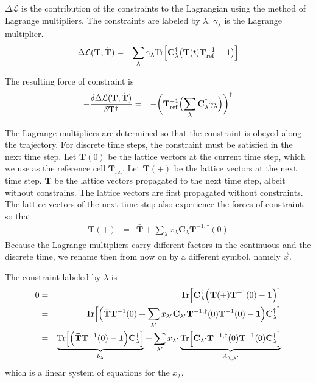 \documentclass[final,12pt,makeidx,DIV=calc]{article}
\newcommand{\mat}[1]{\mathbf{#1}}
\newcommand{\Tr}{\mathrm{Tr}}      %
\begin{document}
{{{{{{$\Delta\mathcal{L}$ is the contribution of the constraints to the
Lagrangian using the method of Lagrange multipliers.  The constraints
are labeled by $\lambda$. $\gamma_\lambda$ is the Lagrange
multiplier.
\begin{eqnarray}
    \Delta\mathcal{L}(\mat{T},\dot{\mat{T}})
&=& \sum_\lambda \gamma_\lambda
         \Tr\Bigl[\mat{C}^\dagger_\lambda
                  \bigl(\mat{T}(t)\mat{T}^{-1}_{\text{ref}}-\mat{1}\bigr)
                  \Bigr]
\end{eqnarray}

The resulting force of constraint is
\begin{eqnarray}
-\frac{\delta\Delta\mathcal{L}(\mat{T},\dot{\mat{T}})}{\delta \mat{T}^\dagger}
&=& -\biggl(\mat{T}^{-1}_{\text{ref}}
\Bigl(\sum_\lambda \mat{C}^\dagger_\lambda \gamma_\lambda
                  \Bigr)\biggr)^\dagger
\end{eqnarray}

The Lagrange multipliers are determined so that the constraint is
obeyed along the trajectory. For discrete time steps, the constraint
must be satisfied in the next time step.  Let $\mat{T}(0)$ be the
lattice vectors at the current time step, which we use as the
reference cell $\mat{T}_{\text{ref}}$. Let $\mat{T}(+)$ be the lattice
vectors at the next time step.  $\mat{\bar{T}}$ be the lattice vectors
propagated to the next time step, albeit without constrains.  The
lattice vectors are first propagated without constraints. The lattice
vectors of the next time step also experience the forces of
constraint, so that
\begin{eqnarray}
\mat{T}(+)&=&\mat{\bar{T}}+\sum_{\lambda}x_\lambda\mat{C}_\lambda
\mat{T}^{-1,\dagger}(0)
\end{eqnarray}
Because the Lagrange multipliers carry different factors in the
continuous and the discrete time, we rename then from now on by a
different symbol, namely $\vec{x}$. 

The constraint labeled by $\lambda$ is
\begin{eqnarray}
0&=&\Tr\Bigl[\mat{C}^\dagger_\lambda
                  \Bigl(\mat{T}(+)\mat{T}^{-1}(0)-\mat{1}\Bigr)
                  \Bigr]
\nonumber\\
&=& \Tr\Bigl[\Bigl(\mat{\bar{T}}\mat{T}^{-1}(0)
+\sum_{\lambda'}x_{\lambda'} \mat{C}_{\lambda'}\mat{T}^{-1,\dagger}(0)\mat{T}^{-1}(0)
-\mat{1}\Bigr)\mat{C}^\dagger_\lambda\Bigr]
\nonumber\\
&=& 
\underbrace{
\Tr\Bigl[\Bigl(\mat{\bar{T}}\mat{T}^{-1}(0)
-\mat{1}\Bigr)\mat{C}^\dagger_\lambda\Bigr]}_{b_\lambda}
+\sum_{\lambda'}x_{\lambda'} 
\underbrace{
\Tr\Bigl[
\mat{C}_{\lambda'}\mat{T}^{-1,\dagger}(0)\mat{T}^{-1}(0)
\mat{C}^\dagger_\lambda\Bigr]
}_{A_{\lambda,\lambda'}}
\end{eqnarray}
which is a linear system of equations for the $x_\lambda$.

}}}}}}
\end{document}
